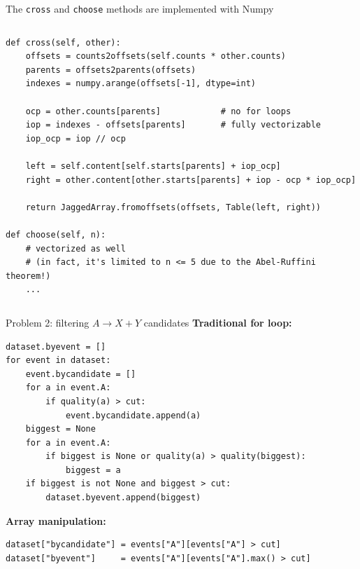 \documentclass[aspectratio=169]{beamer}
\begin{document}
\begin{frame}[fragile]{The {\tt cross} and {\tt choose} methods are implemented with Numpy}
\begin{columns}
\small
\begin{verbatim}
def cross(self, other):
    offsets = counts2offsets(self.counts * other.counts)
    parents = offsets2parents(offsets)
    indexes = numpy.arange(offsets[-1], dtype=int)

    ocp = other.counts[parents]            # no for loops
    iop = indexes - offsets[parents]       # fully vectorizable
    iop_ocp = iop // ocp

    left = self.content[self.starts[parents] + iop_ocp]
    right = other.content[other.starts[parents] + iop - ocp * iop_ocp]

    return JaggedArray.fromoffsets(offsets, Table(left, right))

def choose(self, n):
    # vectorized as well
    # (in fact, it's limited to n <= 5 due to the Abel-Ruffini theorem!)
    ...
\end{verbatim}
\end{columns}
\end{frame}

\begin{frame}[fragile]{Problem 2: filtering $A \to X + Y$ candidates}
\vspace{0.4 cm}
{\bf Traditional for loop:} 
\small
\begin{verbatim}
dataset.byevent = []
for event in dataset:
    event.bycandidate = []
    for a in event.A:
        if quality(a) > cut:
            event.bycandidate.append(a)
    biggest = None
    for a in event.A:
        if biggest is None or quality(a) > quality(biggest):
            biggest = a
    if biggest is not None and biggest > cut:
        dataset.byevent.append(biggest)
\end{verbatim}
\normalsize

\vspace{0.1 cm}
{\bf Array manipulation:} 
\small
\begin{verbatim}
dataset["bycandidate"] = events["A"][events["A"] > cut]
dataset["byevent"]     = events["A"][events["A"].max() > cut]
\end{verbatim}
\end{frame}
\end{document}
